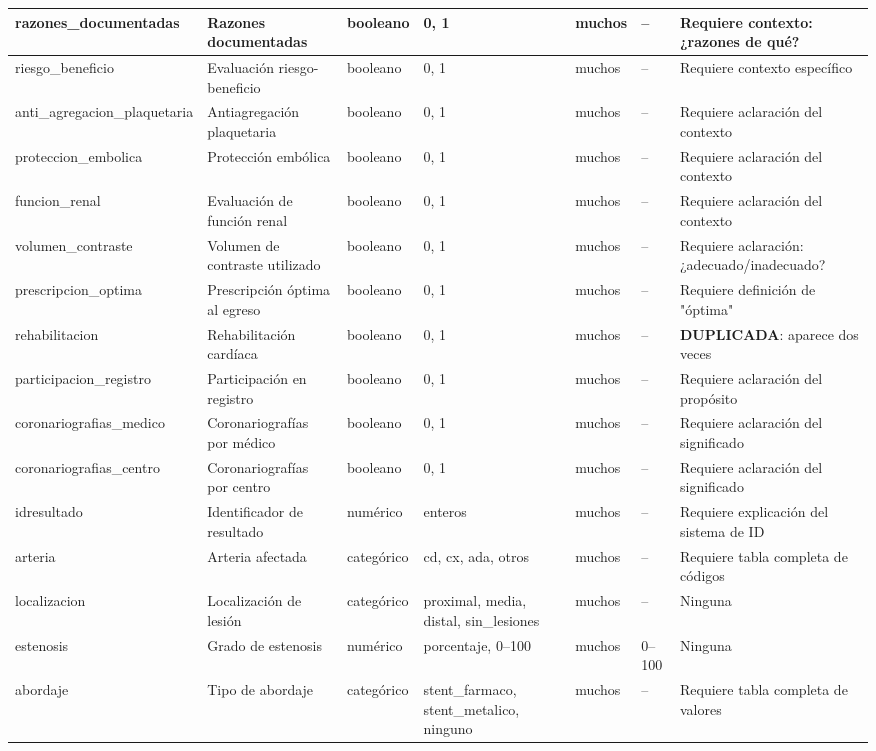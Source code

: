 \documentclass[11pt,a4paper]{article}
\begin{document}
\begin{longtable}{|L{0.095\textwidth}|L{0.17\textwidth}|L{0.07\textwidth}|L{0.16\textwidth}|L{0.14\textwidth}|L{0.13\textwidth}|L{0.15\textwidth}|}
razones\_documentadas & Razones documentadas & booleano & 0, 1 & muchos & -- & Requiere contexto: ¿razones de qué? \\ \hline
riesgo\_beneficio & Evaluación riesgo-beneficio & booleano & 0, 1 & muchos & -- & Requiere contexto específico \\ \hline
anti\_agregacion\_plaquetaria & Antiagregación plaquetaria & booleano & 0, 1 & muchos & -- & Requiere aclaración del contexto \\ \hline
proteccion\_embolica & Protección embólica & booleano & 0, 1 & muchos & -- & Requiere aclaración del contexto \\ \hline
funcion\_renal & Evaluación de función renal & booleano & 0, 1 & muchos & -- & Requiere aclaración del contexto \\ \hline
volumen\_contraste & Volumen de contraste utilizado & booleano & 0, 1 & muchos & -- & Requiere aclaración: ¿adecuado/inadecuado? \\ \hline
prescripcion\_optima & Prescripción óptima al egreso & booleano & 0, 1 & muchos & -- & Requiere definición de "óptima" \\ \hline
rehabilitacion & Rehabilitación cardíaca & booleano & 0, 1 & muchos & -- & \textbf{DUPLICADA}: aparece dos veces \\ \hline
participacion\_registro & Participación en registro & booleano & 0, 1 & muchos & -- & Requiere aclaración del propósito \\ \hline
coronariografias\_medico & Coronariografías por médico & booleano & 0, 1 & muchos & -- & Requiere aclaración del significado \\ \hline
coronariografias\_centro & Coronariografías por centro & booleano & 0, 1 & muchos & -- & Requiere aclaración del significado \\ \hline
idresultado & Identificador de resultado & numérico & enteros & muchos & -- & Requiere explicación del sistema de ID \\ \hline
arteria & Arteria afectada & categórico & cd, cx, ada, otros & muchos & -- & Requiere tabla completa de códigos \\ \hline
localizacion & Localización de lesión & categórico & proximal, media, distal, sin\_lesiones & muchos & -- & Ninguna \\ \hline
estenosis & Grado de estenosis & numérico & porcentaje, 0--100 & muchos & 0--100 & Ninguna \\ \hline
abordaje & Tipo de abordaje & categórico & stent\_farmaco, stent\_metalico, ninguno & muchos & -- & Requiere tabla completa de valores \\ \hline

\end{longtable}
\end{document}
